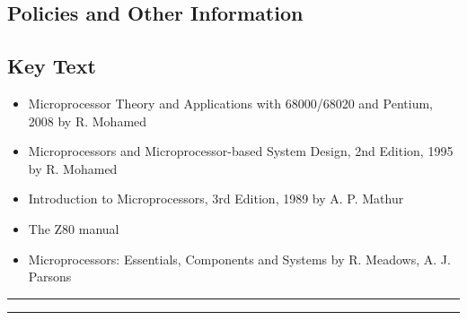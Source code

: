 \subsection*{Policies and Other Information}
\subsection*{Key Text}

\begin{itemize}
    \item Microprocessor Theory and Applications with 68000/68020 and Pentium, 2008 by R. Mohamed
    \item Microprocessors and Microprocessor-based System Design, 2nd Edition, 1995 by R. Mohamed
    \item Introduction to Microprocessors, 3rd Edition, 1989 by A. P. Mathur
    \item The Z80 manual
    \item Microprocessors: Essentials, Components and Systems by R. Meadows, A. J. Parsons
\end{itemize}
\vspace{2ex}\hrule
\vspace{2ex}\hrule\vspace{2ex}